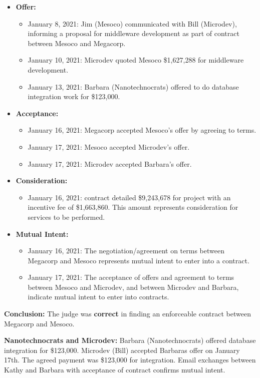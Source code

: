 \documentclass[12pt]{article}
\begin{document}
\begin{itemize}[label=$\bullet$]
    \item \textbf{Offer:}
    \begin{itemize}
        \item January 8, 2021: Jim (Mesoco) communicated with Bill (Microdev), informing a proposal for middleware development as part of contract between Mesoco and Megacorp.
        \item January 10, 2021: Microdev quoted Mesoco \$1,627,288 for middleware development.
        \item January 13, 2021: Barbara (Nanotechnocrats) offered to do database integration work for \$123,000.
    \end{itemize}
    \item \textbf{Acceptance:}
    \begin{itemize}
        \item January 16, 2021: Megacorp accepted Mesoco's offer by agreeing to terms.
        \item January 17, 2021: Mesoco accepted Microdev's offer.
        \item January 17, 2021: Microdev accepted Barbara's offer.
    \end{itemize}
    \item \textbf{Consideration:}
    \begin{itemize}
        \item January 16, 2021: contract detailed \$9,243,678 for project with an incentive fee of \$1,663,860. This amount represents consideration for services to be performed.
    \end{itemize}
    \item \textbf{Mutual Intent:}
    \begin{itemize}
        \item January 16, 2021: The negotiation/agreement on terms between Megacorp and Mesoco represents mutual intent to enter into a contract.
        \item January 17, 2021: The acceptance of offers and agreement to terms between Mesoco and Microdev, and between Microdev and Barbara, indicate mutual intent to enter into contracts.
    \end{itemize}
\end{itemize}

\textbf{Conclusion:} The judge was \textbf{correct} in finding an enforceable contract between Megacorp and Mesoco.

\textbf{Nanotechnocrats and Microdev:}
Barbara (Nanotechnocrats) offered database integration for \$123,000.
Microdev (Bill) accepted Barbaras offer on January 17th.
The agreed payment was \$123,000 for integration.
Email exchanges between Kathy and Barbara with acceptance of contract confirms mutual intent.
\end{document}
